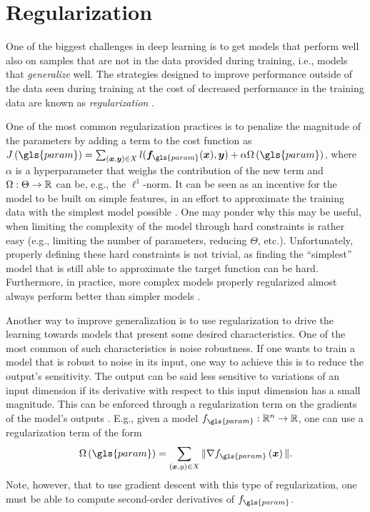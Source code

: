 \section{Regularization}\label{sec:regularization}

One of the biggest challenges in deep learning is to get models that perform well also on samples that are not in the data provided during training, i.e., models that \emph{generalize} well.
The strategies designed to improve performance outside of the data seen during training at the cost of decreased performance in the training data are known as \emph{regularization} \cite{goodfellow_deep_2016}.

One of the most common regularization practices is to penalize the magnitude of the parameters by adding a term to the cost function as $J\left( \gls{param} \right) = \sum_{(\bm{x},\bm{y})\in X} l(\bm{f}_{\gls{param}}(\bm{x}), \bm{y}) + \alpha\Omega\left( \gls{param} \right) $, where $\alpha$ is a hyperparameter that weighs the contribution of the new term and $\Omega:\Theta\to\mathbb{R}$ can be, e.g., the $\ell^1$-norm.
It can be seen as an incentive for the model to be built on simple features, in an effort to approximate the training data with the simplest model possible \cite{goodfellow_deep_2016}.
One may ponder why this may be useful, when limiting the complexity of the model through hard constraints is rather easy (e.g., limiting the number of parameters, reducing $\Theta$, etc.).
Unfortunately, properly defining these hard constraints is not trivial, as finding the ``simplest'' model that is still able to approximate the target function can be hard.
Furthermore, in practice, more complex models properly regularized almost always perform better than simpler models \cite{goodfellow_deep_2016}.

Another way to improve generalization is to use regularization to drive the learning towards models that present some desired characteristics.
One of the most common of such characteristics is noise robustness.
If one wants to train a model that is robust to noise in its input, one way to achieve this is to reduce the output's sensitivity.
The output can be said less sensitive to variations of an input dimension if its derivative with respect to this input dimension has a small magnitude.
This can be enforced through a regularization term on the gradients of the model's outputs \cite{drucker_improving_1992}.
E.g., given a model $f_{\gls{param}}:\R^n\to\R$, one can use a regularization term of the form \[
    \Omega\left( \gls{param} \right) = \sum_{\left( \bm{x},y \right) \in X} \| \nabla f_{\gls{param}}\left( \bm{x} \right) \|
.\] Note, however, that to use gradient descent with this type of regularization, one must be able to compute second-order derivatives of $f_{\gls{param}}$.

